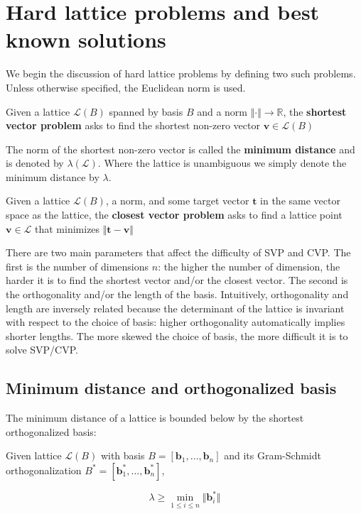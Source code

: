 \section{Hard lattice problems and best known solutions}
We begin the discussion of hard lattice problems by defining two such problems. Unless otherwise specified, the Euclidean norm is used.

\begin{definition}
    Given a lattice $\mathcal{L}(B)$ spanned by basis $B$ and a norm $\Vert \cdot \Vert \rightarrow \mathbb{R}$, the \textbf{shortest vector problem} asks to find the shortest non-zero vector $\mathbf{v} \in \mathcal{L}(B)$
\end{definition}

The norm of the shortest non-zero vector is called the \textbf{minimum distance} and is denoted by $\lambda(\mathcal{L})$. Where the lattice is unambiguous we simply denote the minimum distance by $\lambda$.

\begin{definition}
    Given a lattice $\mathcal{L}(B)$, a norm, and some target vector $\mathbf{t}$ in the same vector space as the lattice, the \textbf{closest vector problem} asks to find a lattice point $\mathbf{v} \in \mathcal{L}$ that minimizes $\Vert \mathbf{t} - \mathbf{v}\Vert$
\end{definition}

There are two main parameters that affect the difficulty of SVP and CVP. The first is the number of dimensions $n$: the higher the number of dimension, the harder it is to find the shortest vector and/or the closest vector. The second is the orthogonality and/or the length of the basis. Intuitively, orthogonality and length are inversely related because the determinant of the lattice is invariant with respect to the choice of basis: higher orthogonality automatically implies shorter lengths. The more skewed the choice of basis, the more difficult it is to solve SVP/CVP.

\subsection{Minimum distance and orthogonalized basis}
The minimum distance of a lattice is bounded below by the shortest orthogonalized basis:

\begin{theorem}
    Given lattice $\mathcal{L}(B)$ with basis $B = [\mathbf{b}_1, \ldots, \mathbf{b}_n]$ and its Gram-Schmidt orthogonalization $B^\ast = [\mathbf{b}_1^\ast, \ldots, \mathbf{b}_n^\ast]$,

    $$
    \lambda \geq \min_{1 \leq i \leq n} \Vert \mathbf{b}_i^\ast \Vert
    $$
\end{theorem}

